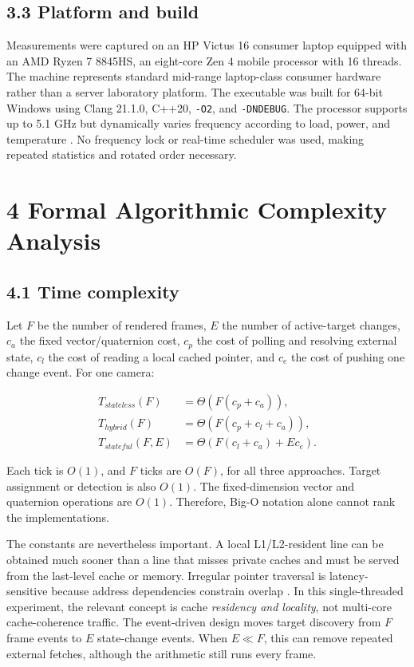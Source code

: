 \subsection{3.3 Platform and build}

Measurements were captured on an HP Victus 16 consumer laptop equipped with an AMD Ryzen 7 8845HS, an eight-core Zen 4 mobile processor with 16 threads. The machine represents standard mid-range laptop-class consumer hardware rather than a server laboratory platform. The executable was built for 64-bit Windows using Clang 21.1.0, C++20, \texttt{-O2}, and \texttt{-DNDEBUG}. The processor supports up to 5.1 GHz but dynamically varies frequency according to load, power, and temperature \cite{amdspec}. No frequency lock or real-time scheduler was used, making repeated statistics and rotated order necessary.

\section{4 Formal Algorithmic Complexity Analysis}

\subsection{4.1 Time complexity}

Let \(F\) be the number of rendered frames, \(E\) the number of active-target changes, \(c_a\) the fixed vector/quaternion cost, \(c_p\) the cost of polling and resolving external state, \(c_l\) the cost of reading a local cached pointer, and \(c_e\) the cost of pushing one change event. For one camera:

\begin{align}
T_{stateless}(F) &= \Theta(F(c_p+c_a)), \\
T_{hybrid}(F) &= \Theta(F(c_p+c_l+c_a)), \\
T_{stateful}(F,E) &= \Theta(F(c_l+c_a)+E c_e).
\end{align}

Each tick is \(O(1)\), and \(F\) ticks are \(O(F)\), for all three approaches. Target assignment or detection is also \(O(1)\). The fixed-dimension vector and quaternion operations are \(O(1)\). Therefore, Big-O notation alone cannot rank the implementations.

The constants are nevertheless important. A local L1/L2-resident line can be obtained much sooner than a line that misses private caches and must be served from the last-level cache or memory. Irregular pointer traversal is latency-sensitive because address dependencies constrain overlap \cite{weisz2016}. In this single-threaded experiment, the relevant concept is cache \textit{residency and locality}, not multi-core cache-coherence traffic. The event-driven design moves target discovery from \(F\) frame events to \(E\) state-change events. When \(E \ll F\), this can remove repeated external fetches, although the arithmetic still runs every frame.


